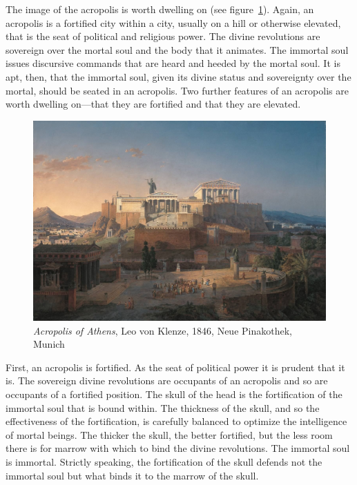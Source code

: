 The image of the acropolis is worth dwelling on (see figure~\ref{acropolis}). Again, an acropolis is a fortified city within a city, usually on a hill or otherwise elevated, that is the seat of political and religious power. The divine revolutions are sovereign over the mortal soul and the body that it animates. The immortal soul issues discursive commands that are heard and heeded by the mortal soul. It is apt, then, that the immortal soul, given its divine status and sovereignty over the mortal, should be seated in an acropolis. Two further features of an acropolis are worth dwelling on---that they are fortified and that they are elevated.

\begin{figure}[htbp]
     \centering
         \includegraphics[scale=0.20]{graphics/Akropolis_by_Leo_von_Klenze.jpg}
     \caption{\emph{Acropolis of Athens}, Leo von Klenze, 1846, Neue Pinakothek, Munich}
     \label{acropolis}
\end{figure}

First, an acropolis is fortified. As the seat of political power it is prudent that it is. The sovereign divine revolutions are occupants of an acropolis and so are occupants of a fortified position. The skull of the head is the fortification of the immortal soul that is bound within. The thickness of the skull, and so the effectiveness of the fortification, is carefully balanced to optimize the intelligence of mortal beings. The thicker the skull, the better fortified, but the less room there is for marrow with which to bind the divine revolutions. The immortal soul is immortal. Strictly speaking, the fortification of the skull defends not the immortal soul but what binds it to the marrow of the skull. 

